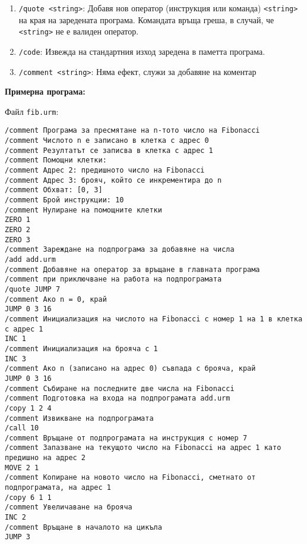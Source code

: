 \documentclass[12pt,a4paper]{article}
\newcommand{\code}[1]{\texttt{#1}}
\begin{document}
{\begin{enumerate}
    Ако преди изпълнението на командата \code{/add} в паметта има заредена програма с обхват $[a,b]$ и $N$ на брой инструкции, а новата програма има обхват $[a',b']$, новата програма $P$ да се преработи така, че:
    \begin{itemize}
    \item да има обхват $[a'+b+1,b'+b+1]$, т.е. всички адреси на клетки, срещащи се в инструкции на $P$, да се увеличат с числото $b+1$;
    \item всички номера на инструкции, които се споменават в инструкции \code{JUMP} в $P$, да бъдат увеличени с $N$.
    \end{itemize}

    Операторите на $P$ да се добавят последователно към края на заредената в паметта програма.
    \item \code{/quote <string>}: Добавя нов оператор (инструкция или команда) \code{<string>} на края на заредената програма. Командата връща греша, в случай, че \code{<string>} не е валиден оператор.
    \item \code{/code}: Извежда на стандартния изход заредена в паметта програма.
    \item \code{/comment <string>}: Няма ефект, служи за добавяне на коментар
    \end{enumerate}

    \textbf{Примерна програма:}

Файл \code{fib.urm}:
\begin{verbatim}
/comment Програма за пресмятане на n-тото число на Fibonacci
/comment Числото n е записано в клетка с адрес 0
/comment Резултатът се записва в клетка с адрес 1
/comment Помощни клетки:
/comment Адрес 2: предишното число на Fibonacci
/comment Адрес 3: брояч, който се инкрементира до n
/comment Обхват: [0, 3]
/comment Брой инструкции: 10
/comment Нулиране на помощните клетки
ZERO 1
ZERO 2
ZERO 3
/comment Зареждане на подпрограма за добавяне на числа
/add add.urm
/comment Добавяне на оператор за връщане в главната програма
/comment при приключване на работа на подпрограмата
/quote JUMP 7
/comment Ако n = 0, край
JUMP 0 3 16
/comment Инициализация на числото на Fibonacci с номер 1 на 1 в клетка с адрес 1
INC 1
/comment Инициализация на брояча с 1
INC 3
/comment Ако n (записано на адрес 0) съвпада с брояча, край
JUMP 0 3 16
/comment Събиране на последните две числа на Fibonacci
/comment Подготовка на входа на подпрограмата add.urm
/copy 1 2 4
/comment Извикване на подпрограмата
/call 10
/comment Връщане от подпрограмата на инструкция с номер 7
/comment Запазване на текущото число на Fibonacci на адрес 1 като предишно на адрес 2
MOVE 2 1
/comment Копиране на новото число на Fibonacci, сметнато от подпрограмата, на адрес 1
/copy 6 1 1
/comment Увеличаване на брояча
INC 2
/comment Връщане в началото на цикъла
JUMP 3
\end{verbatim}

}
\end{document}
